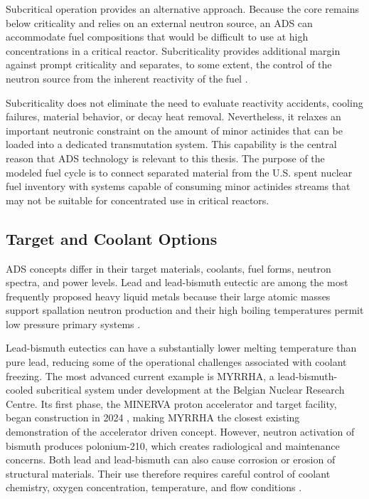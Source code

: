 Subcritical operation provides an alternative approach. Because the core
remains below criticality and relies on an external neutron source, an \gls{ADS}
can accommodate fuel compositions that would be difficult to use at high
concentrations in a critical reactor. Subcriticality provides additional
margin against prompt criticality and separates, to some extent, the control
of the neutron source from the inherent reactivity of the fuel
\cite{eriksson_ads_safety_2004}.

Subcriticality does not eliminate the need to evaluate reactivity accidents,
cooling failures, material behavior, or decay heat removal. Nevertheless, it
relaxes an important neutronic constraint on the amount of minor actinides
that can be loaded into a dedicated transmutation system. This capability is
the central reason that \gls{ADS} technology is relevant to this thesis. The
purpose of the modeled fuel cycle is to connect separated material from the
U.S. spent nuclear fuel inventory with systems capable of consuming
minor actinides streams that may not be suitable for concentrated use in
critical reactors.

\subsection{Target and Coolant Options}
\label{subsec:ads-target-coolant}

\gls{ADS} concepts differ in their target materials, coolants, fuel forms, neutron
spectra, and power levels. Lead and lead-bismuth eutectic are among the
most frequently proposed heavy liquid metals because their large atomic
masses support spallation neutron production and their high boiling
temperatures permit low pressure primary systems
\cite{aitabderrahim_myrrha_2001,nea_ads_components_2010}.

Lead-bismuth eutectics can have a substantially lower melting temperature than
pure lead, reducing some of the operational challenges associated with
coolant freezing. The most advanced current example is \gls{MYRRHA}, a lead-bismuth-cooled
subcritical system under development at the Belgian Nuclear Research Centre.
Its first phase, the \gls{MINERVA} proton accelerator and target facility, began
construction in 2024 \cite{dordaImplementationStatusMyrrha2024}, making \gls{MYRRHA} the closest
existing demonstration of the accelerator driven concept.
However, neutron activation of bismuth produces
polonium-210, which creates radiological and maintenance concerns. Both
lead and lead-bismuth can also cause corrosion or erosion of structural
materials. Their use therefore requires careful control of coolant chemistry,
oxygen concentration, temperature, and flow conditions
\cite{nea_ads_components_2010}.

